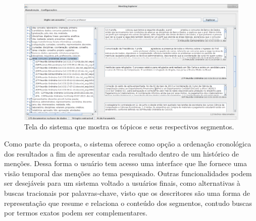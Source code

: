   \begin{figure}[!h]
	  \centering
	  \includegraphics[width=\textwidth]{conteudo/capitulos/figs/consulta.png}
	  \caption{Tela do sistema que mostra os tópicos e seus respectivos segmentos.}
	  \label{fig:tela-principal}
  \end{figure}


Como parte da proposta, o sistema oferece como opção a ordenação cronológica dos resultados a fim de apresentar cada resultado dentro de um histórico de menções. Dessa forma o usuário tem acesso uma interface que lhe fornece uma visão temporal das menções ao tema pesquisado.
Outras funcionalidades podem ser desejáveis para um sistema voltado a usuários finais, como alternativas à buscas tracionais por palavras-chave, visto que os descritores são uma forma de representação que resume e relaciona o conteúdo dos segmentos, contudo buscas por termos exatos podem ser complementares. 





